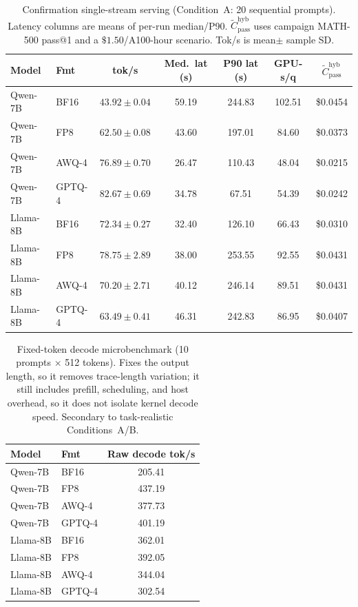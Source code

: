 \documentclass[11pt,a4paper]{article}
\begin{document}
\begin{table}[t]
\centering
\caption{Confirmation single-stream serving (Condition~A: 20 sequential prompts). Latency columns are means of per-run median/P90. $\widetilde{C}_{\mathrm{pass}}^{\mathrm{hyb}}$ uses campaign MATH-500 pass@1 and a $\$1.50$/A100-hour scenario. Tok/s is mean$\pm$ sample SD.}
\label{tab:serving-single}
\small
\begin{tabular}{llccccc}
\toprule
\textbf{Model} & \textbf{Fmt} & \textbf{tok/s} & \textbf{Med.\ lat (s)} & \textbf{P90 lat (s)} & \textbf{GPU-s/q} & \textbf{$\widetilde{C}_{\mathrm{pass}}^{\mathrm{hyb}}$} \\
\midrule
Qwen-7B & BF16   & $43.92\pm 0.04$ & 59.19 & 244.83 & 102.51 & \$0.0454 \\
Qwen-7B & FP8    & $62.50\pm 0.08$ & 43.60 & 197.01 & 84.60 & \$0.0373 \\
Qwen-7B & AWQ-4  & $76.89\pm 0.70$ & 26.47 & 110.43 & 48.04 & \$0.0215 \\
Qwen-7B & GPTQ-4 & $82.67\pm 0.69$ & 34.78 & 67.51 & 54.39 & \$0.0242 \\
\midrule
Llama-8B & BF16   & $72.34\pm 0.27$ & 32.40 & 126.10 & 66.43 & \$0.0310 \\
Llama-8B & FP8    & $78.75\pm 2.89$ & 38.00 & 253.55 & 92.55 & \$0.0431 \\
Llama-8B & AWQ-4  & $70.20\pm 2.71$ & 40.12 & 246.14 & 89.51 & \$0.0431 \\
Llama-8B & GPTQ-4 & $63.49\pm 0.41$ & 46.31 & 242.83 & 86.95 & \$0.0407 \\
\bottomrule
\end{tabular}
\end{table}

\begin{table}[t]
\centering
\caption{Fixed-token decode microbenchmark (10 prompts $\times$ 512 tokens). Fixes the output length, so it removes trace-length variation; it still includes prefill, scheduling, and host overhead, so it does not isolate kernel decode speed. Secondary to task-realistic Conditions~A/B.}
\label{tab:serving-micro}
\small
\begin{tabular}{llc}
\toprule
\textbf{Model} & \textbf{Fmt} & \textbf{Raw decode tok/s} \\
\midrule
Qwen-7B & BF16   & 205.41 \\
Qwen-7B & FP8    & 437.19 \\
Qwen-7B & AWQ-4  & 377.73 \\
Qwen-7B & GPTQ-4 & 401.19 \\
\midrule
Llama-8B & BF16   & 362.01 \\
Llama-8B & FP8    & 392.05 \\
Llama-8B & AWQ-4  & 344.04 \\
Llama-8B & GPTQ-4 & 302.54 \\
\bottomrule
\end{tabular}
\end{table}
\end{document}
